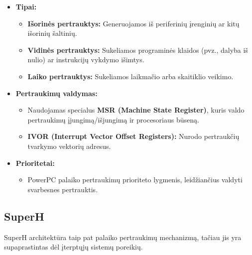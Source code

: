 \documentclass{article}
\begin{document}
\begin{itemize}
    \item \textbf{Tipai:}
        \begin{itemize}
            \item \textbf{Išorinės pertrauktys:} Generuojamos iš periferinių įrenginių ar kitų išorinių šaltinių.
            \item \textbf{Vidinės pertrauktys:} Sukeliamos programinės klaidos (pvz., dalyba iš nulio) ar instrukcijų vykdymo išimtys.
            \item \textbf{Laiko pertrauktys:} Sukeliamos laikmačio arba skaitiklio veikimo.
        \end{itemize}
    \item \textbf{Pertraukimų valdymas:}
        \begin{itemize}
            \item Naudojamas specialus \textbf{MSR (Machine State Register)}, kuris valdo pertraukimų įjungimą/išjungimą ir procesoriaus būseną.
            \item \textbf{IVOR (Interrupt Vector Offset Registers):} Nurodo pertraukčių tvarkymo vektorių adresus.
        \end{itemize}
    \item \textbf{Prioritetai:}
        \begin{itemize}
            \item PowerPC palaiko pertraukimų prioriteto lygmenis, leidžiančius valdyti svarbesnes pertrauktis.
        \end{itemize}
\end{itemize}

\subsection{SuperH}
SuperH architektūra taip pat palaiko pertraukimų mechanizmą, tačiau jis yra supaprastintas dėl įterptųjų sistemų poreikių.
\end{document}

